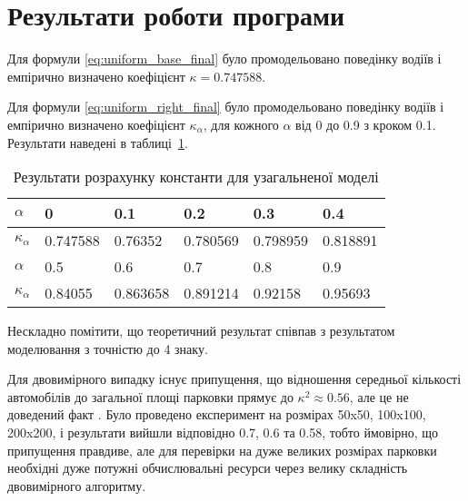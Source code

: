 \section{Результати роботи програми}
\label{sec:result_analyse}

Для формули \eqref{eq:uniform_base_final} було промодельовано поведінку водіїв і емпірично визначено коефіцієнт $\kappa=0.747588$.

Для формули \eqref{eq:uniform_right_final} було промодельовано поведінку водіїв і емпірично визначено коефіцієнт $\kappa_\alpha$, для кожного $\alpha$ від 0 до 0.9 з кроком 0.1. Результати наведені в таблиці~\ref{tab:uniform_right_model_result}.

\begin{table}[ht]
	\caption{Результати розрахунку константи для узагальненої моделі}
	\centering
\begin{tabular}{|p{}|p{}|p{}|p{}|p{}|p{}|}
	\hline
	$\alpha$ & 0 & 0.1 & 0.2 & 0.3 & 0.4 \\
	\hline
	$\kappa_\alpha$ & 0.747588 &0.76352 &0.780569 &0.798959 &0.818891  \\
	\hline
	\hline
	$\alpha$  & 0.5 & 0.6 & 0.7 & 0.8 & 0.9\\
	\hline
	$\kappa_\alpha$  &0.84055 &0.863658 &0.891214 &0.92158 &0.95693 \\
	\hline
\end{tabular}	
	\label{tab:uniform_right_model_result}
\end{table}

Нескладно помітити, що теоретичний результат співпав з результатом моделювання з точністю до 4 знаку.

Для двовимірного випадку існує припущення, що відношення середньої кількості автомобілів до загальної площі парковки прямує до $\kappa^2 \approx 0.56$, але це не доведений факт \cite{MathWorldRenyi}. Було проведено експеримент на розмірах 50x50, 100x100, 200x200, і результати вийшли відповідно 0.7, 0.6 та 0.58, тобто ймовірно, що припущення правдиве, але для перевірки на дуже великих розмірах парковки необхідні дуже потужні обчислювальні ресурси через велику складність двовимірного алгоритму.